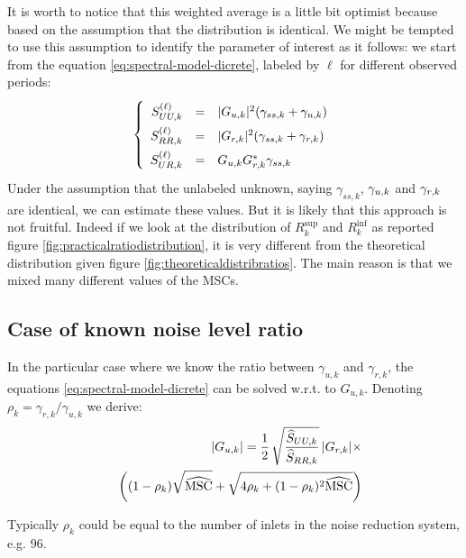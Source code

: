 It is worth to notice that this weighted average is a little bit optimist because based on the assumption that the distribution is identical.
We might be tempted to use this assumption to identify the parameter of interest as it follows: we start from the equation \eqref{eq:spectral-model-dicrete}, labeled by $\ell$ for different observed periods:
\begin{eqnarray}
\label{eq:spectral-model-dicrete-ell}
\left\{
\renewcommand\arraystretch{1.6}
\begin{array}{rcl}
S_{UU,k}^{(\ell)}&=&|G_{\ut,k}|^{2} (\gamma_{ss,k}+\gamma_{\ut,k})
\\
S_{RR,k}^{(\ell)}&=&|G_{\rf,k}|^{2} (\gamma_{ss,k}+\gamma_{\rf,k})
\\
S_{UR,k}^{(\ell)}&=&G_{\ut,k}G^{*}_{\rf,k}\gamma_{ss,k}
\end{array}
\right.
\end{eqnarray}
Under the assumption that the unlabeled unknown, saying $\gamma_{ss,k}$, $\gamma_{{u},k}$  and
$\gamma_{{r},k}$ are identical, we can estimate these values. But it is likely that this approach is not fruitful. Indeed if we look at the distribution of  $R_{k}^{\sup}$ and $R_{k}^{\inf}$  as reported figure \ref{fig:practicalratiodistribution}, it is very different from the theoretical distribution given figure \ref{fig:theoreticaldistribratios}. The  main reason is that we mixed many different values of the MSCs.

\subsection{Case of known noise level ratio}
In the particular case where we know the ratio between $\gamma_{u,k}$ and  $\gamma_{r,k}$, the equations \eqref{eq:spectral-model-dicrete} can be solved w.r.t. to $G_{u,k}$. Denoting $\rho_{k}=\gamma_{r,k}/\gamma_{u,k}$ we derive:
\begin{eqnarray}
\label{eq:known-noise-ratio}
&&\hspace{-1cm}|G_{\ut,k}|=
\frac{1}{2}\,\sqrt{\frac{\hat S_{UU,k}}{\hat S_{RR,k}}}\,|G_{\rf,k}|\times 
\\&&\nonumber
\left(
(1-\rho_{k})\sqrt{\hMSC}+\sqrt{4\rho_{k}+(1-\rho_{k})^{2}\hMSC}
\right)
\end{eqnarray}


Typically $\rho_{k}$ could be equal to the number of inlets in the noise reduction system, e.g. $96$.


